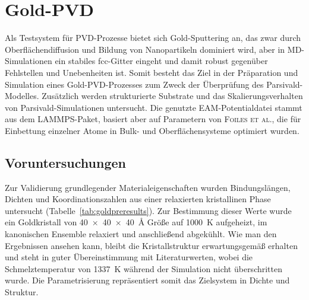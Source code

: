 \section{Gold-PVD}
\label{goldpvd}

Als Testsystem für PVD-Prozesse bietet sich Gold-Sputtering an, das zwar durch Oberflächendiffusion und Bildung von Nanopartikeln dominiert wird, aber in MD-Simulationen ein stabiles fcc-Gitter eingeht und damit robust gegenüber Fehlstellen und Unebenheiten ist.
Somit besteht das Ziel in der Präparation und Simulation eines Gold-PVD-Prozesses zum Zweck der Überprüfung des Parsivald-Modelles.
Zusätzlich werden strukturierte Substrate und das Skalierungsverhalten von Parsivald-Simulationen untersucht.
Die genutzte EAM-Potentialdatei stammt aus dem LAMMPS-Paket, basiert aber auf Parametern von \textsc{Foiles et al.}\cite{foiles_embedded-atom-method_1986}, die für Einbettung einzelner Atome in Bulk- und Oberflächensysteme optimiert wurden.

\subsection{Voruntersuchungen}

Zur Validierung grundlegender Materialeigenschaften wurden Bindungslängen, Dichten und Koordinationszahlen aus einer relaxierten kristallinen Phase untersucht (Tabelle~\ref{tab:goldpreresults}).
Zur Bestimmung dieser Werte wurde ein Goldkristall von \SI{40x40x40}{\angstrom} Größe auf \SI{1000}{\kelvin} aufgeheizt, im kanonischen Ensemble relaxiert und anschließend abgekühlt.
Wie man den Ergebnissen ansehen kann, bleibt die Kristallstruktur erwartungsgemäß erhalten und steht in guter Übereinstimmung mit Literaturwerten, wobei die Schmelztemperatur von \SI{1337}{\kelvin} während der Simulation nicht überschritten wurde.
Die Parametrisierung repräsentiert somit das Zielsystem in Dichte und Struktur.

